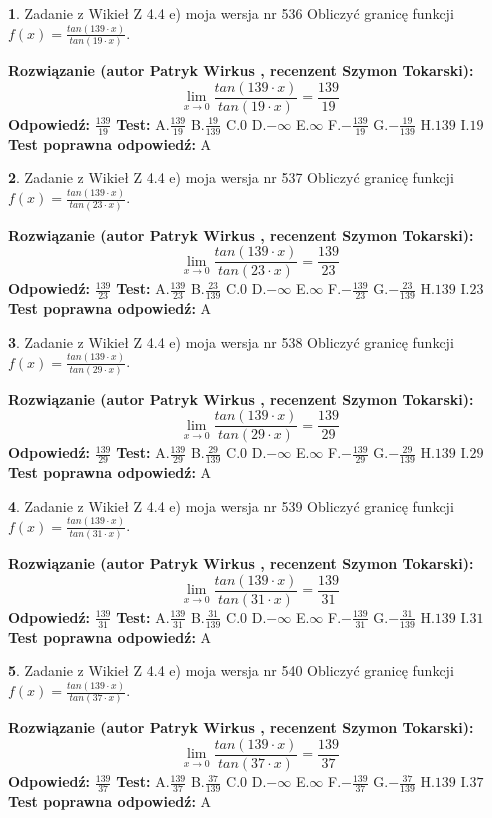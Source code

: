\documentclass[12pt, a4paper]{article}
\theoremstyle{definition} %
\newtheorem{zad}{}
\newcommand{\zadStart}[1]{\begin{zad}#1\newline}
\newcommand{\zadStop}{\end{zad}}
\newcommand{\rozwStart}[2]{\noindent \textbf{Rozwiązanie (autor #1 , recenzent #2): }\newline}
\newcommand{\rozwStop}{\newline}
\newcommand{\odpStart}{\noindent \textbf{Odpowiedź:}\newline}
\newcommand{\odpStop}{\newline}
\newcommand{\testStart}{\noindent \textbf{Test:}\newline}
\newcommand{\testStop}{\newline}
\newcommand{\kluczStart}{\noindent \textbf{Test poprawna odpowiedź:}\newline}
\newcommand{\kluczStop}{\newline}
\begin{document}
\zadStart{Zadanie z Wikieł Z 4.4 e) moja wersja nr 536}
Obliczyć granicę funkcji $f(x)=\frac{tan(139\cdot x)}{tan(19\cdot x)}$.
\zadStop
\rozwStart{Patryk Wirkus}{Szymon Tokarski}
$$\lim\limits_{x\to 0}\frac{tan(139\cdot x)}{tan(19\cdot x)}=
\frac{139}{19}$$
\rozwStop
\odpStart
$\frac{139}{19}$
\odpStop
\testStart
A.$\frac{139}{19}$
B.$\frac{19}{139}$
C.$0$
D.$-\infty$
E.$\infty$
F.$-\frac{139}{19}$
G.$-\frac{19}{139}$
H.$139$
I.$19$
\testStop
\kluczStart
A
\kluczStop



\zadStart{Zadanie z Wikieł Z 4.4 e) moja wersja nr 537}
Obliczyć granicę funkcji $f(x)=\frac{tan(139\cdot x)}{tan(23\cdot x)}$.
\zadStop
\rozwStart{Patryk Wirkus}{Szymon Tokarski}
$$\lim\limits_{x\to 0}\frac{tan(139\cdot x)}{tan(23\cdot x)}=
\frac{139}{23}$$
\rozwStop
\odpStart
$\frac{139}{23}$
\odpStop
\testStart
A.$\frac{139}{23}$
B.$\frac{23}{139}$
C.$0$
D.$-\infty$
E.$\infty$
F.$-\frac{139}{23}$
G.$-\frac{23}{139}$
H.$139$
I.$23$
\testStop
\kluczStart
A
\kluczStop



\zadStart{Zadanie z Wikieł Z 4.4 e) moja wersja nr 538}
Obliczyć granicę funkcji $f(x)=\frac{tan(139\cdot x)}{tan(29\cdot x)}$.
\zadStop
\rozwStart{Patryk Wirkus}{Szymon Tokarski}
$$\lim\limits_{x\to 0}\frac{tan(139\cdot x)}{tan(29\cdot x)}=
\frac{139}{29}$$
\rozwStop
\odpStart
$\frac{139}{29}$
\odpStop
\testStart
A.$\frac{139}{29}$
B.$\frac{29}{139}$
C.$0$
D.$-\infty$
E.$\infty$
F.$-\frac{139}{29}$
G.$-\frac{29}{139}$
H.$139$
I.$29$
\testStop
\kluczStart
A
\kluczStop



\zadStart{Zadanie z Wikieł Z 4.4 e) moja wersja nr 539}
Obliczyć granicę funkcji $f(x)=\frac{tan(139\cdot x)}{tan(31\cdot x)}$.
\zadStop
\rozwStart{Patryk Wirkus}{Szymon Tokarski}
$$\lim\limits_{x\to 0}\frac{tan(139\cdot x)}{tan(31\cdot x)}=
\frac{139}{31}$$
\rozwStop
\odpStart
$\frac{139}{31}$
\odpStop
\testStart
A.$\frac{139}{31}$
B.$\frac{31}{139}$
C.$0$
D.$-\infty$
E.$\infty$
F.$-\frac{139}{31}$
G.$-\frac{31}{139}$
H.$139$
I.$31$
\testStop
\kluczStart
A
\kluczStop



\zadStart{Zadanie z Wikieł Z 4.4 e) moja wersja nr 540}
Obliczyć granicę funkcji $f(x)=\frac{tan(139\cdot x)}{tan(37\cdot x)}$.
\zadStop
\rozwStart{Patryk Wirkus}{Szymon Tokarski}
$$\lim\limits_{x\to 0}\frac{tan(139\cdot x)}{tan(37\cdot x)}=
\frac{139}{37}$$
\rozwStop
\odpStart
$\frac{139}{37}$
\odpStop
\testStart
A.$\frac{139}{37}$
B.$\frac{37}{139}$
C.$0$
D.$-\infty$
E.$\infty$
F.$-\frac{139}{37}$
G.$-\frac{37}{139}$
H.$139$
I.$37$
\testStop
\kluczStart
A
\kluczStop
\end{document}
